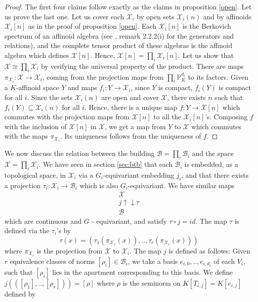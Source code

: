 \documentclass{amsart}
\theoremstyle{theorem}
\theoremstyle{lemma}
\theoremstyle{prop}
\theoremstyle{definition}
\theoremstyle{corollary}
\theoremstyle{remark}
\newcommand{\B}{\mathcal{B}}
\newcommand{\X}{\mathcal{X}}
\newcommand{\PR}{\mathbb{P}}
\begin{document}
\begin{proof}
The first four claims follow exactly as the claims in proposition \ref{open}. Let us prove the last one. Let us cover each $\X_i$ by open sets $\X_i(n)$ and by affinoids $\X_i[n]$ as in the proof of proposition \ref{open}. Each $\X_i[n]$ is the Berkovich spectrum of an affinoid algebra (see \cite{ber2}, remark 2.2.2(i) for the generators and relations), and the complete tensor product of these algebras is the affinoid algebra which defines $\X[n]$. Hence, $\X[n] =\prod_i \X_i[n]$.
Let us show that $\X \cong \prod_i \X_i$ by verifying the universal property of the product. There are maps $\pi_{\X_i}:\X \rightarrow \X_i$, coming from the projection maps from $\prod_i \PR^{d_i}_K$ to its factors. Given a $K$-affinoid space $Y$ and maps $f_i:Y \rightarrow \X_i$, since $Y$ is compact, $f_i(Y)$ is compact for all $i$. Since the sets $\X_i(n)$ are open and cover $\X$, there exists $n$ such that $f_i(Y) \subseteq \X_i(n)$ for all $i$. Hence, there is a unique map $f: Y\rightarrow \X[n]$ which commutes with the projection maps from $\X[n]$ to all the $\X_i[n]$'s. Composing $f$ with the inclusion of $\X[n]$ in $\X$, we get a map from $Y$ to $\X$ which commutes with the maps $\pi_{\X_i}$. Its uniqueness follows from the uniqueness of $f$.  
\end{proof}

We now discuss the relation between the building $\B=\prod_i \B_i$ and the space $\X= \prod_i \X_i$. We have seen in section \ref{sec:btb} that each $\B_i$ is embedded, as a topological space, in $\X_i$ via a $G_i$-equivariant embedding $j_i$, and that there exists a projection $\tau_i:\X_i \rightarrow \B_i$ which is also $G_i$-equivariant. We have similar maps
\[ \begin{array}{c}
\X \\
j\uparrow \downarrow \tau \\
\B
\end{array}\]
which are continuous and $G$ - equivariant, and satisfy $\tau \circ j = id$. The map $\tau$ is defined via the $\tau_i$'s by 
$$\tau(x)=(\tau_1(\pi_{\X_1}(x)), .., \tau_r(\pi_{\X_r}(x)))$$ where $\pi_{\X_i}$ is the projection from $\X$ to $\X_i$. The map $j$ is defined as follows: Given $r$ equivalence classes of norms $[\rho_i]\in \B_i$, we take a basis $e_{i,0},..,e_{i,d_i}$ of each $V_i$, such that $[\rho_i]$ lies in the apartment corresponding to this basis. We define $j(([\rho_1],..,[\rho_r]))=[\rho]$ where $\rho$ is the  seminorm on $K[T_{i,j}]=K[e_{i,j}]$ defined by 
\end{document}
